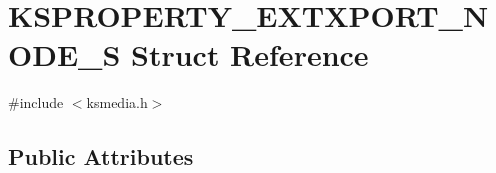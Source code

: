 \hypertarget{struct_k_s_p_r_o_p_e_r_t_y___e_x_t_x_p_o_r_t___n_o_d_e___s}{}\section{K\+S\+P\+R\+O\+P\+E\+R\+T\+Y\+\_\+\+E\+X\+T\+X\+P\+O\+R\+T\+\_\+\+N\+O\+D\+E\+\_\+S Struct Reference}
\label{struct_k_s_p_r_o_p_e_r_t_y___e_x_t_x_p_o_r_t___n_o_d_e___s}


{\ttfamily \#include $<$ksmedia.\+h$>$}

\subsection*{Public Attributes}
